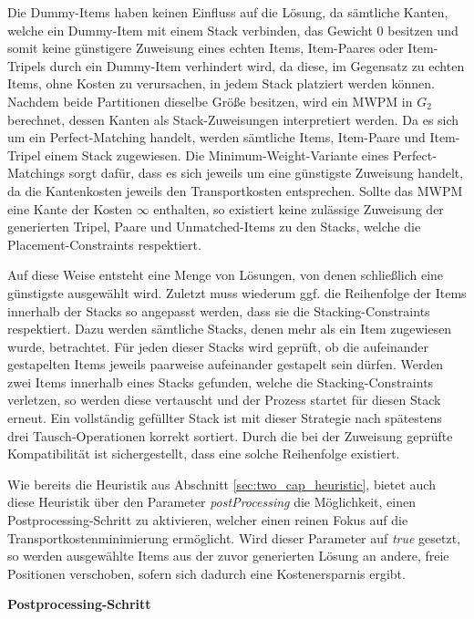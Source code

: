 Die Dummy-Items haben keinen Einfluss auf die Lösung, da sämtliche Kanten, welche ein Dummy-Item mit einem Stack verbinden,
das Gewicht $0$ besitzen und somit keine günstigere Zuweisung eines echten Items, Item-Paares oder Item-Tripels durch ein Dummy-Item verhindert wird, da diese, im Gegensatz zu echten Items, ohne Kosten zu verursachen, in jedem Stack platziert
werden können. Nachdem beide Partitionen dieselbe Größe besitzen, wird ein \textsc{MWPM} in $G_2$ berechnet, dessen Kanten
als Stack-Zuweisungen interpretiert werden. Da es sich um ein Perfect-Matching handelt, werden sämtliche Items, Item-Paare
und Item-Tripel einem Stack zugewiesen. Die Minimum-Weight-Variante eines Perfect-Matchings sorgt dafür, dass es sich
jeweils um eine günstigste Zuweisung handelt, da die Kantenkosten jeweils den Transportkosten entsprechen.
Sollte das \textsc{MWPM} eine Kante der Kosten $\infty$ enthalten, so existiert keine zulässige Zuweisung
der generierten Tripel, Paare und Unmatched-Items zu den Stacks, welche die Placement-Constraints respektiert.

Auf diese Weise entsteht eine Menge von Lösungen, von denen schließlich eine günstigste ausgewählt wird.
Zuletzt muss wiederum ggf. die Reihenfolge der Items innerhalb der Stacks so angepasst werden,
dass sie die Stacking-Constraints respektiert. Dazu werden sämtliche Stacks, denen mehr als
ein Item zugewiesen wurde, betrachtet. Für jeden dieser Stacks wird geprüft, ob die aufeinander
gestapelten Items jeweils paarweise aufeinander gestapelt sein dürfen.
Werden zwei Items innerhalb eines Stacks gefunden, welche die Stacking-Constraints verletzen, so werden diese
vertauscht und der Prozess startet für diesen Stack erneut. Ein vollständig gefüllter Stack ist mit dieser
Strategie nach spätestens drei Tausch-Operationen korrekt sortiert. Durch die bei der Zuweisung geprüfte
Kompatibilität ist sichergestellt, dass eine solche Reihenfolge existiert.

Wie bereits die Heuristik aus Abschnitt \ref{sec:two_cap_heuristic}, bietet auch diese Heuristik über den Parameter
\textit{postProcessing} die Möglichkeit, einen Postprocessing-Schritt zu aktivieren, welcher einen reinen Fokus
auf die Transportkostenminimierung ermöglicht. Wird dieser Parameter auf \textit{true} gesetzt, so werden ausgewählte Items aus der zuvor generierten Lösung an andere, freie Positionen verschoben, sofern sich dadurch eine Kostenersparnis ergibt.

\textbf{Postprocessing-Schritt}

